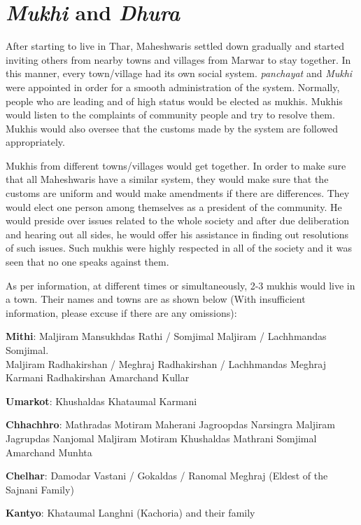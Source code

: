 \chapter{\textit{Mukhi} and \textit{Dhura}}
After starting to live in Thar, Maheshwaris settled down gradually and started
inviting others from nearby towns and villages from Marwar to stay together. In
this manner, every town/village had its own social system. \textit{panchayat}
and \textit{Mukhi} were appointed in order for a smooth administration of the
system. Normally, people who are leading and of high status would be elected as
mukhis. Mukhis would listen to the complaints of community people and try to
resolve them. Mukhis would also oversee that the customs made by the system are
followed appropriately.

Mukhis from different towns/villages would get together. In order to make sure
that all Maheshwaris have a similar system, they would make sure that the
customs are uniform and would make amendments if there are differences. They
would elect one person among themselves as a president of the community. He
would preside over issues related to the whole society and after due
deliberation and hearing out all sides, he would offer his assistance in
finding out resolutions of such issues. Such mukhis were highly respected in
all of the society and it was seen that no one speaks against them. 

As per information, at different times or simultaneously, 2-3 mukhis would live
in a town. Their names and towns are as shown below (With insufficient
information, please excuse if there are any omissions):

\textbf{Mithi}: Maljiram Mansukhdas Rathi / Somjimal Maljiram / Lachhmandas Somjimal.\\
                Maljiram Radhakirshan / Meghraj Radhakirshan / Lachhmandas Meghraj Karmani
                Radhakirshan Amarchand Kullar

\textbf{Umarkot}: Khushaldas Khataumal Karmani

\textbf{Chhachhro}: Mathradas Motiram Maherani
                    Jagroopdas Narsingra
                    Maljiram Jagrupdas
                    Nanjomal Maljiram
                    Motiram Khushaldas Mathrani
                    Somjimal Amarchand Munhta


\textbf{Chelhar}: Damodar Vastani / Gokaldas / Ranomal
                  Meghraj (Eldest of the Sajnani Family)

\textbf{Kantyo}: Khataumal Langhni (Kachoria) and their family

